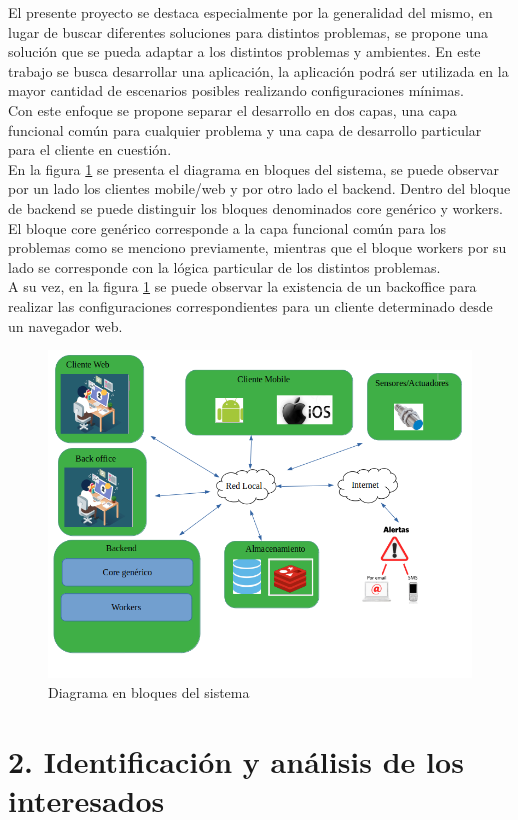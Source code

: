 \documentclass[
11pt, %
]{charter}
\begin{document}
 El presente proyecto se destaca especialmente por la generalidad del mismo, en lugar de buscar diferentes soluciones para distintos problemas, se propone una solución que se pueda adaptar a los distintos problemas y ambientes. En este trabajo se busca desarrollar una aplicación, la aplicación podrá ser utilizada en la mayor cantidad de escenarios posibles realizando configuraciones mínimas.\\
 Con este enfoque se propone separar el desarrollo en dos capas, una capa funcional común para cualquier problema y una capa de desarrollo particular para el cliente en cuestión.\\   
En la figura \ref{fig:diagBloques} se presenta el diagrama en bloques del sistema, se puede observar por un lado los clientes mobile/web y por otro lado el backend. Dentro del bloque de backend se puede distinguir los bloques denominados core genérico y workers. El bloque core genérico corresponde a la capa funcional común para los problemas como se menciono previamente, mientras que el bloque workers por su lado se corresponde con la lógica particular de los distintos problemas.\\
A su vez, en la figura \ref{fig:diagBloques} se puede observar la existencia de un backoffice para realizar las configuraciones correspondientes para un cliente determinado desde un navegador web.


 \begin{figure}[htpb]
\centering 
\includegraphics[width=.8\textwidth]{./Figuras/iot_nico.png}
\caption{Diagrama en bloques del sistema}
\label{fig:diagBloques}
\end{figure}

\section{2. Identificación y análisis de los interesados}
\label{sec:interesados}
\end{document}
